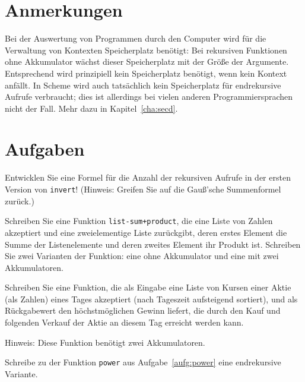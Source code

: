 \section*{Anmerkungen}

Bei der Auswertung von Programmen durch den Computer wird für die
Verwaltung von Kontexten Speicherplatz benötigt: Bei rekursiven
Funktionen ohne Akkumulator wächst dieser Speicherplatz mit der Größe
der Argumente.  Entsprechend wird prinzipiell kein Speicherplatz
benötigt, wenn kein Kontext anfällt.  In Scheme wird auch tatsächlich
kein Speicherplatz für endrekursive Aufrufe verbraucht; dies ist
allerdings bei vielen anderen Programmiersprachen nicht der Fall.
Mehr dazu in Kapitel~\ref{cha:secd}.

\section*{Aufgaben}

\begin{aufgabe}
  \label{ref:o-of-invert}
  Entwicklen Sie eine Formel für die Anzahl der rekursiven Aufrufe in
  der ersten Version von \texttt{invert}!  (Hinweis: Greifen Sie auf
  die Gauß'sche Summenformel zurück.)
\end{aufgabe}

\begin{aufgabe}
  Schreiben Sie eine Funktion \texttt{list-sum+product}, die eine
  Liste von Zahlen akzeptiert und eine zweielementige Liste
  zurückgibt, deren erstes Element die Summe der Listenelemente und
  deren zweites Element ihr Produkt ist.  Schreiben Sie zwei Varianten
  der Funktion: eine ohne Akkumulator und eine mit zwei Akkumulatoren.
\end{aufgabe}

\begin{aufgabe}
  Schreiben Sie eine Funktion, die als Eingabe eine Liste von Kursen
  einer Aktie (als Zahlen) eines Tages akzeptiert (nach Tageszeit
  aufsteigend sortiert), und als Rückgabewert den höchstmöglichen
  Gewinn liefert, die durch den Kauf und folgenden Verkauf der Aktie
  an diesem Tag erreicht werden kann.

  Hinweis: Diese Funktion benötigt zwei Akkumulatoren.
\end{aufgabe}

\begin{aufgabe}
  Schreibe zu der Funktion \texttt{power} aus Aufgabe~\ref{aufg:power} eine
  endrekursive Variante.
\end{aufgabe}


